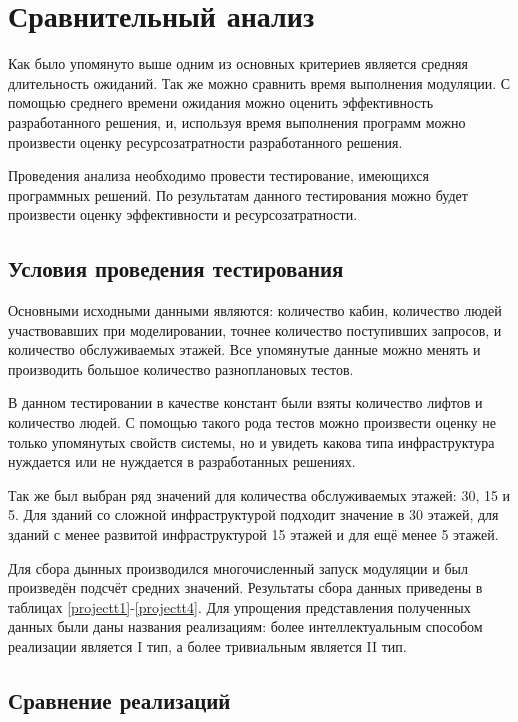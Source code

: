 \section{Сравнительный анализ}

	Как было упомянуто выше одним из основных критериев является средняя длительность ожиданий.
		Так же можно сравнить время выполнения модуляции. С помощью среднего времени ожидания
		можно оценить эффективность разработанного решения, и, используя время выполнения программ можно
		произвести оценку ресурсозатратности разработанного решения.

	Проведения анализа необходимо провести тестирование, имеющихся программных решений.
		По результатам данного тестирования можно будет произвести оценку эффективности и ресурсозатратности.

	\subsection{Условия проведения тестирования}

		Основными исходными данными являются: количество кабин, количество людей участвовавших при моделировании,
			точнее количество поступивших запросов, и количество  обслуживаемых этажей.
			Все упомянутые данные можно менять и производить большое количество разноплановых тестов. 

		В данном тестировании в качестве констант были взяты количество лифтов и количество людей.
			С помощью такого рода тестов можно произвести оценку не только упомянутых свойств системы, но и 
			увидеть какова типа инфраструктура нуждается или не нуждается в разработанных решениях.

		Так же был выбран ряд значений для количества обслуживаемых этажей: 30, 15 и 5.
			Для зданий со сложной инфраструктурой подходит значение в 30 этажей, для зданий с менее развитой
			инфраструктурой 15 этажей и для ещё менее 5 этажей.

		 Для сбора дынных производился многочисленный запуск модуляции и был произведён подсчёт средних значений.
		 	  Результаты сбора данных приведены в таблицах \ref{projectt1}-\ref{projectt4}.
			  Для упрощения представления полученных данных были даны названия реализациям: более интеллектуальным способом
			  реализации является I тип, а более тривиальным является II тип.

	\subsection{Сравнение реализаций}

